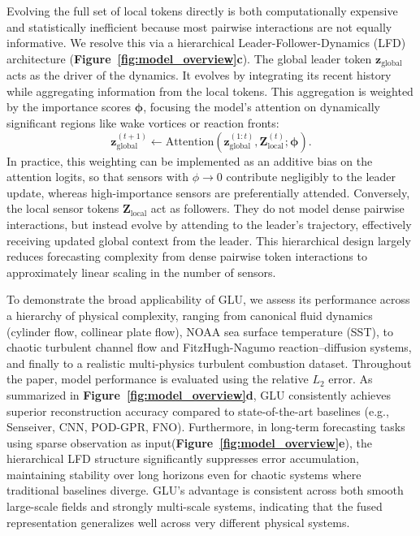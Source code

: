 \documentclass[pdflatex,sn-nature]{sn-jnl}%
\begin{document}
Evolving the full set of local tokens directly is both computationally expensive and statistically inefficient because most pairwise interactions are not equally informative.
We resolve this via a hierarchical Leader-Follower-Dynamics (LFD) architecture (\textbf{Figure~\ref{fig:model_overview}c}).
The global leader token $\mathbf{z}_{\text{global}}$ acts as the driver of the dynamics. 
It evolves by integrating its recent history while aggregating information from the local tokens.
This aggregation is weighted by the importance scores $\boldsymbol{\phi}$, focusing the model's attention on dynamically significant regions like wake vortices or reaction fronts:
\begin{equation}
    \mathbf{z}_{\text{global}}^{(t+1)} \leftarrow \text{Attention}(\mathbf{z}_{\text{global}}^{(1:t)}, \mathbf{Z}_{\text{local}}^{(t)}; \boldsymbol{\phi}).
\end{equation}
In practice, this weighting can be implemented as an additive bias on the attention logits, so that sensors with $\phi \rightarrow 0$ contribute negligibly to the leader update, whereas high-importance sensors are preferentially attended.
Conversely, the local sensor tokens $\mathbf{Z}_{\text{local}}$ act as followers. 
They do not model dense pairwise interactions, but instead evolve by attending to the leader's trajectory, effectively receiving updated global context from the leader.
This hierarchical design largely reduces forecasting complexity from dense pairwise token interactions to approximately linear scaling in the number of sensors.

To demonstrate the broad applicability of GLU, we assess its performance across a hierarchy of physical complexity, ranging from canonical fluid dynamics (cylinder flow, collinear plate flow), NOAA sea surface temperature (SST), to chaotic turbulent channel flow and FitzHugh-Nagumo reaction–diffusion systems, and finally to a realistic multi-physics turbulent combustion dataset. 
Throughout the paper, model performance is evaluated using the relative $L_2$ error.
As summarized in \textbf{Figure~\ref{fig:model_overview}d}, GLU consistently achieves superior reconstruction accuracy compared to state-of-the-art baselines (e.g., Senseiver, CNN, POD-GPR, FNO).
Furthermore, in long-term forecasting tasks using sparse observation as input(\textbf{Figure~\ref{fig:model_overview}e}), the hierarchical LFD structure significantly suppresses error accumulation, maintaining stability over long horizons even for chaotic systems where traditional baselines diverge.
GLU's advantage is consistent across both smooth large-scale fields and strongly multi-scale systems, indicating that the fused representation generalizes well across very different physical systems.
\end{document}
